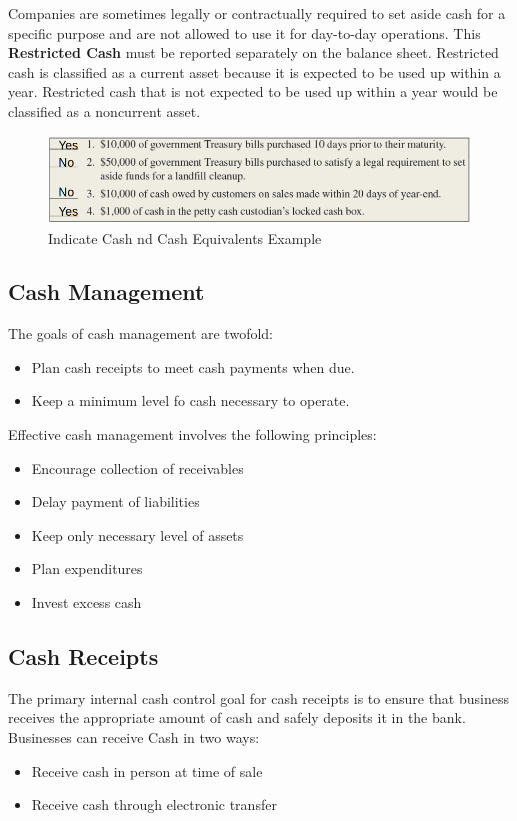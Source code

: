 \documentclass[../main.tex]{subfiles}
\begin{document}
	Companies are sometimes legally or contractually required to set aside cash 
	for a specific purpose and are not allowed to use it for day-to-day 
	operations. This \textbf{Restricted Cash} must be reported separately on 
	the balance sheet. Restricted cash is classified as a current asset because 
	it is expected to be used up within a year. Restricted cash that is not 
	expected to be used up within a year would be classified as a noncurrent 
	asset.
	
	\begin{figure}[ht]
		\centering
		\includegraphics[width=1\columnwidth]{images/c5/reporting_cash_eg.png}
		\caption{Indicate Cash nd Cash Equivalents Example}
	\end{figure}
	
	\subsection{Cash Management}
	
	The goals of cash management are twofold:
	\begin{itemize}[noitemsep]
		\item Plan cash receipts to meet cash payments when due.
		\item Keep a minimum level fo cash necessary to operate. 
	\end{itemize}

	Effective cash management involves the following principles:
	\begin{itemize}[noitemsep]
		\item Encourage collection of receivables
		\item Delay payment of liabilities
		\item Keep only necessary level of assets
		\item Plan expenditures
		\item Invest excess cash
	\end{itemize}
	
	\subsection{Cash Receipts}
	
	The primary internal cash control goal for cash receipts is to ensure that 
	business receives the appropriate amount of cash and safely deposits it in 
	the bank. Businesses can receive Cash in two ways:
	\begin{itemize}[noitemsep]
		\item Receive cash in person at time of sale
		\item Receive cash through electronic transfer
	\end{itemize}
	
\end{document}
